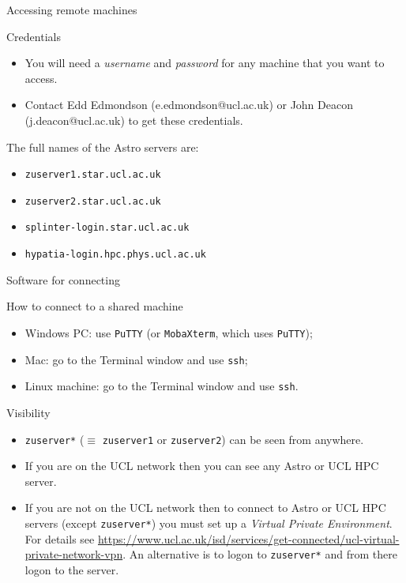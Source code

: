 \documentclass[dvipsnames]{beamer}
\newcommand{\command}[1]{\colorbox{light-gray}{\texttt{#1}}}
\newcommand{\server}[1]{\textcolor{BrickRed}{\texttt{#1}}}
\begin{document}
\begin{frame}{Accessing remote machines}
  \begin{block}{Credentials}
    \begin{itemize}
      \item You will need a \textit{username} and \textit{password} for any machine that you want to access.
      \item Contact Edd Edmondson (e.edmondson@ucl.ac.uk) or John Deacon (j.deacon@ucl.ac.uk) to get these credentials.
    \end{itemize}
  \end{block}
  \begin{block}{The full names of the Astro servers are:}
    \begin{itemize}
      \item \server{zuserver1.star.ucl.ac.uk}
      \item \server{zuserver2.star.ucl.ac.uk}
      \item \server{splinter-login.star.ucl.ac.uk}
      \item \server{hypatia-login.hpc.phys.ucl.ac.uk}
    \end{itemize}
  \end{block}
\end{frame}


\begin{frame}{Software for connecting}
  \begin{block}{How to connect to a shared machine}
    \begin{itemize}
      \item Windows PC: use \command{PuTTY} (or \command{MobaXterm}, which uses \command{PuTTY});
      \item Mac: go to the Terminal window and use \command{ssh};
      \item Linux machine: go to the Terminal window and use \command{ssh}.
    \end{itemize}
  \end{block}
\end{frame}


\begin{frame}{Visibility}
  \begin{block}{}
    \begin{itemize}
    \item \server{zuserver*} ($\equiv$ \server{zuserver1} or \server{zuserver2}) can be seen from anywhere.
    \item If you are on the UCL network then you can see any Astro or UCL HPC server.
    \item If you are not on the UCL network then to connect to Astro or UCL HPC servers (except \server{zuserver*}) you must set up a \textit{Virtual Private Environment}. For details see \url{https://www.ucl.ac.uk/isd/services/get-connected/ucl-virtual-private-network-vpn}. An alternative is to logon to \server{zuserver*} and from there logon to the server.
    \end{itemize}
  \end{block}
\end{frame}
\end{document}
